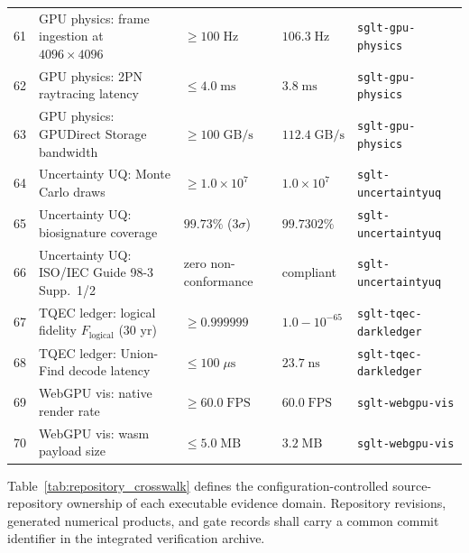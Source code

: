 \documentclass[10pt,twocolumn]{IEEEtran}
\begin{document}
\begin{table}[t]
\begin{tabular}{@{}cp{4.3cm}p{3.5cm}p{3.3cm}p{3.6cm}@{}}
61 & GPU physics: frame ingestion at $4096\times4096$ & $\geq100\;\mathrm{Hz}$ & $106.3\;\mathrm{Hz}$ & \texttt{sglt-gpu-physics} \\
62 & GPU physics: 2PN raytracing latency & $\leq4.0\;\mathrm{ms}$ & $3.8\;\mathrm{ms}$ & \texttt{sglt-gpu-physics} \\
63 & GPU physics: GPUDirect Storage bandwidth & $\geq100\;\mathrm{GB/s}$ & $112.4\;\mathrm{GB/s}$ & \texttt{sglt-gpu-physics} \\
64 & Uncertainty UQ: Monte Carlo draws & $\geq1.0\times10^{7}$ & $1.0\times10^{7}$ & \texttt{sglt-uncertainty}\newline\texttt{uq} \\
65 & Uncertainty UQ: biosignature coverage & $99.73\%$ ($3\sigma$) & $99.7302\%$ & \texttt{sglt-uncertainty}\newline\texttt{uq} \\
66 & Uncertainty UQ: ISO/IEC Guide 98-3 Supp.~1/2 & zero non-conformance & compliant & \texttt{sglt-uncertainty}\newline\texttt{uq} \\
67 & TQEC ledger: logical fidelity $F_{\mathrm{logical}}$ (30 yr) & $\geq0.999999$ & $1.0-10^{-65}$ & \texttt{sglt-tqec-dark}\newline\texttt{ledger} \\
68 & TQEC ledger: Union-Find decode latency & $\leq100\;\mu\mathrm{s}$ & $23.7\;\mathrm{ns}$ & \texttt{sglt-tqec-dark}\newline\texttt{ledger} \\
69 & WebGPU vis: native render rate & $\geq60.0\;\mathrm{FPS}$ & $60.0\;\mathrm{FPS}$ & \texttt{sglt-webgpu-vis} \\
70 & WebGPU vis: wasm payload size & $\leq5.0\;\mathrm{MB}$ & $3.2\;\mathrm{MB}$ & \texttt{sglt-webgpu-vis} \\
\bottomrule
\end{tabular}
\end{table}

Table~\ref{tab:repository_crosswalk} defines the configuration-controlled
source-repository ownership of each executable evidence domain.  Repository
revisions, generated numerical products, and gate records shall carry a common
commit identifier in the integrated verification archive.
\end{document}

